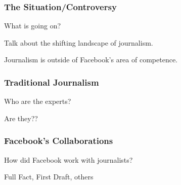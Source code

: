 %
\subsubsection{The Situation/Controversy}

\par What is going on?


\par Talk about the shifting landscape of journalism.


\par Journalism is outside of Facebook's area of competence.

%
\subsubsection{Traditional Journalism}

\par Who are the experts?


\par Are they??

%
\subsubsection{Facebook's Collaborations}

\par How did Facebook work with journalists?


\par Full Fact, First Draft, others